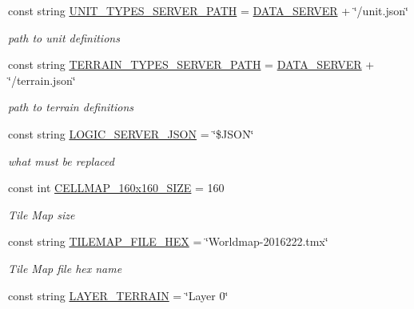 \begin{DoxyCompactItemize}
const string \hyperlink{classClient_1_1Common_1_1Constants_1_1ClientConstants_a7a52dd583176369742f5f05e3da82bb7}{U\+N\+I\+T\+\_\+\+T\+Y\+P\+E\+S\+\_\+\+S\+E\+R\+V\+E\+R\+\_\+\+P\+A\+T\+H} = \hyperlink{classClient_1_1Common_1_1Constants_1_1ClientConstants_a906b8b02ae4c5068a0e8200f61874cec}{D\+A\+T\+A\+\_\+\+S\+E\+R\+V\+E\+R} + \char`\"{}/unit.\+json\char`\"{}
\begin{DoxyCompactList}\small\item\em path to unit definitions \end{DoxyCompactList}\item 
const string \hyperlink{classClient_1_1Common_1_1Constants_1_1ClientConstants_a2e2d0395db1d6330b07fba92b549f101}{T\+E\+R\+R\+A\+I\+N\+\_\+\+T\+Y\+P\+E\+S\+\_\+\+S\+E\+R\+V\+E\+R\+\_\+\+P\+A\+T\+H} = \hyperlink{classClient_1_1Common_1_1Constants_1_1ClientConstants_a906b8b02ae4c5068a0e8200f61874cec}{D\+A\+T\+A\+\_\+\+S\+E\+R\+V\+E\+R} + \char`\"{}/terrain.\+json\char`\"{}
\begin{DoxyCompactList}\small\item\em path to terrain definitions \end{DoxyCompactList}\item 
const string \hyperlink{classClient_1_1Common_1_1Constants_1_1ClientConstants_aacd3cd9238a59108e9d40e41f2bebaf8}{L\+O\+G\+I\+C\+\_\+\+S\+E\+R\+V\+E\+R\+\_\+\+J\+S\+O\+N} = \char`\"{}\$J\+S\+O\+N\char`\"{}
\begin{DoxyCompactList}\small\item\em what must be replaced \end{DoxyCompactList}\item 
const int \hyperlink{classClient_1_1Common_1_1Constants_1_1ClientConstants_a45a000cbafb8b16b4b85b45aa8c759b6}{C\+E\+L\+L\+M\+A\+P\+\_\+160x160\+\_\+\+S\+I\+Z\+E} = 160
\begin{DoxyCompactList}\small\item\em Tile Map size \end{DoxyCompactList}\item 
const string \hyperlink{classClient_1_1Common_1_1Constants_1_1ClientConstants_a0acdf6f003dab7a1b7934cb1790edc6e}{T\+I\+L\+E\+M\+A\+P\+\_\+\+F\+I\+L\+E\+\_\+\+H\+E\+X} = \char`\"{}Worldmap-\/2016222.tmx\char`\"{}
\begin{DoxyCompactList}\small\item\em Tile Map file hex name \end{DoxyCompactList}\item 
const string \hyperlink{classClient_1_1Common_1_1Constants_1_1ClientConstants_a030be363536485e0eb319e8989ad554c}{L\+A\+Y\+E\+R\+\_\+\+T\+E\+R\+R\+A\+I\+N} = \char`\"{}Layer 0\char`\"{}

\end{DoxyCompactItemize}
